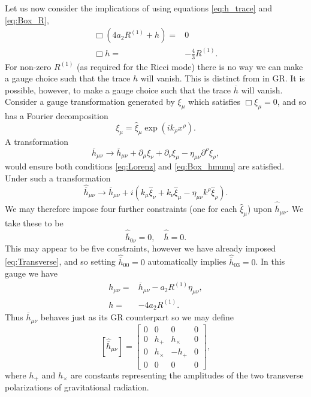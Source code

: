 Let us now consider the implications of  using equations \eqref{eq:h_trace} and \eqref{eq:Box_R},
\begin{align}
\Box\left(4a_2R^{(1)} + h\right) = {} & 0 \nonumber \\
\Box h = {} & -\frac{4}{3}R^{(1)}.
\end{align}
For non-zero $R^{(1)}$ (as required for the Ricci mode) there is no way we can make a gauge choice such that the trace $h$ will vanish\cite{Corda2007, Capozziello2008}. This is distinct from in GR. It is possible, however, to make a gauge choice such that the trace $\overline{h}$ will vanish. Consider a gauge transformation generated by $\xi_\mu$ which satisfies $\Box \xi_\mu = 0$, and so has a Fourier decomposition
\begin{equation}
\xi_\mu = \widehat{\xi}_\mu \exp\left(ik_\rho x^\rho\right).
\end{equation}
A transformation
\begin{equation}
\overline{h}_{\mu\nu} \rightarrow \overline{h}_{\mu\nu} + \partial_\mu\xi_\nu + \partial_\nu\xi_\mu - \eta_{\mu\nu}\partial^\rho\xi_\rho,
\end{equation}
would ensure both conditions \eqref{eq:Lorenz} and \eqref{eq:Box_hmunu} are satisfied\cite{Misner1973}. Under such a transformation
\begin{equation}
\widehat{\overline{h}}_{\mu\nu} \rightarrow \widehat{\overline{h}}_{\mu\nu} + i\left(k_\mu\widehat{\xi}_\nu + k_\nu\widehat{\xi}_\mu - \eta_{\mu\nu}k^\rho\widehat{\xi}_\rho\right).
\end{equation}
We may therefore impose four further constraints (one for each $\widehat{\xi}_\mu$) upon $\widehat{\overline{h}}_{\mu\nu}$. We take these to be
\begin{equation}
\widehat{\overline{h}}_{0\nu} = 0, \quad \widehat{\overline{h}} = 0.
\end{equation}
This may appear to be five constraints, however we have already imposed \eqref{eq:Transverse}, and so setting $\widehat{\overline{h}}_{00} = 0$ automatically implies $\widehat{\overline{h}}_{03} = 0$. In this gauge we have
\begin{align}
h_{\mu\nu} = {} & \overline{h}_{\mu\nu} - a_2 R^{(1)}\eta_{\mu\nu},\\
h = {} & -4a_2R^{(1)}.
\label{eq:gauge}
\end{align}
Thus $\overline{h}_{\mu\nu}$ behaves just as its GR counterpart so we may define
\begin{equation}
\left[\widehat{\overline{h}}_{\mu\nu}\right] =
\begin{bmatrix}
0 & 0 & 0 & 0\\
0 & h_+ & h_\times & 0\\
0 & h_\times & -h_+ & 0\\
0 & 0 & 0 & 0
\end{bmatrix},
\end{equation}
where $h_+$ and $h_\times$ are constants representing the amplitudes of the two transverse polarizations of gravitational radiation.

